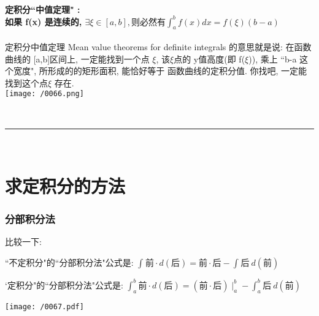 \documentclass[UTF8]{ctexart}
\begin{document}
	
	
	\subsection{定积分``中值定理" : \\
		如果 f(x) 是连续的, $ \exists \xi  \in [a,b], \text{则必然有}\int_a^b{f(x)dx=f(\xi)(b-a)}$}
	
	定积分中值定理 Mean value theorems for definite integrals 的意思就是说: 在函数曲线的 [a,b]区间上, 一定能找到一个点 $\xi$, 该$\xi$点的 y值高度(即 f($\xi$)), 乘上 ``b-a 这个宽度", 所形成的的矩形面积, 能恰好等于 函数曲线的定积分值.  你找吧, 一定能找到这个点$\xi$ 存在. \\
	
	\texttt{[image: /0066.png]}
	
	
	~\\
	\hrule
	~\\
	
	\part{求定积分的方法}
	
	
	\section{分部积分法}
	
	比较一下: 
	
	``不定积分"的``分部积分法"公式是: $\boxed{\int_{}^{}{\text{前}\cdot d(\text{后})}=\text{前}\cdot \text{后}-\int_{}^{}{\text{后}}\ d(\text{前})}	$
	
	`定积分"的``分部积分法"公式是: $\boxed{\int_a^b{\text{前}\cdot d(\text{后})}=\left( \text{前}\cdot \text{后} \right) \mid_{a}^{b}-\int_a^b{\text{后}}\ d(\text{前})}	$
	
	\begin{myEnvSample}
	\texttt{[image: /0067.pdf]}
	\end{myEnvSample}
	

	
	
	
	
	
\end{document}
